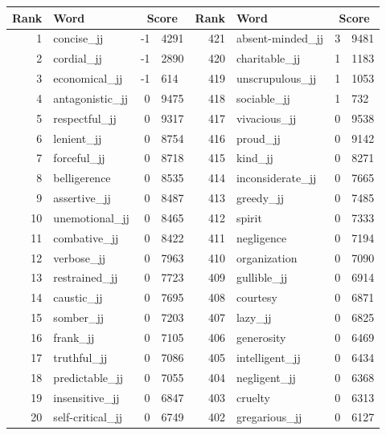 \begin{table}[tbp]
    \begin{tabular}{| rlr@{.}l | rlr@{.}l |}
    \hline
    \textbf{Rank} & \textbf{Word} & \multicolumn{2}{c|}{\textbf{Score}} & \textbf{Rank} & \textbf{Word} & \multicolumn{2}{c|}{\textbf{Score}} \\
    \hline
    1 & concise\_jj & -1 & 4291    &    421 & absent-minded\_jj & 3 & 9481 \\
    2 & cordial\_jj & -1 & 2890    &    420 & charitable\_jj & 1 & 1183 \\
    3 & economical\_jj & -1 & 614    &    419 & unscrupulous\_jj & 1 & 1053 \\
    4 & antagonistic\_jj & 0 & 9475    &    418 & sociable\_jj & 1 & 732 \\
    5 & respectful\_jj & 0 & 9317    &    417 & vivacious\_jj & 0 & 9538 \\
    6 & lenient\_jj & 0 & 8754    &    416 & proud\_jj & 0 & 9142 \\
    7 & forceful\_jj & 0 & 8718    &    415 & kind\_jj & 0 & 8271 \\
    8 & belligerence & 0 & 8535    &    414 & inconsiderate\_jj & 0 & 7665 \\
    9 & assertive\_jj & 0 & 8487    &    413 & greedy\_jj & 0 & 7485 \\
    10 & unemotional\_jj & 0 & 8465    &    412 & spirit & 0 & 7333 \\
    11 & combative\_jj & 0 & 8422    &    411 & negligence & 0 & 7194 \\
    12 & verbose\_jj & 0 & 7963    &    410 & organization & 0 & 7090 \\
    13 & restrained\_jj & 0 & 7723    &    409 & gullible\_jj & 0 & 6914 \\
    14 & caustic\_jj & 0 & 7695    &    408 & courtesy & 0 & 6871 \\
    15 & somber\_jj & 0 & 7203    &    407 & lazy\_jj & 0 & 6825 \\
    16 & frank\_jj & 0 & 7105    &    406 & generosity & 0 & 6469 \\
    17 & truthful\_jj & 0 & 7086    &    405 & intelligent\_jj & 0 & 6434 \\
    18 & predictable\_jj & 0 & 7055    &    404 & negligent\_jj & 0 & 6368 \\
    19 & insensitive\_jj & 0 & 6847    &    403 & cruelty & 0 & 6313 \\
    20 & self-critical\_jj & 0 & 6749    &    402 & gregarious\_jj & 0 & 6127 \\

\end{tabular}
\end{table}

